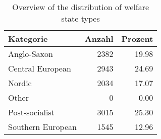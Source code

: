 \begin{table}[!h]
\centering
\caption{Overview of the distribution of welfare state types}
\centering
\begin{tabular}[t]{lrr}
\toprule
Kategorie & Anzahl & Prozent\\
\midrule
Anglo-Saxon & 2382 & 19.98\\
Central European & 2943 & 24.69\\
Nordic & 2034 & 17.07\\
Other & 0 & 0.00\\
Post-socialist & 3015 & 25.30\\
\addlinespace
Southern European & 1545 & 12.96\\
\bottomrule
\end{tabular}
\end{table}
